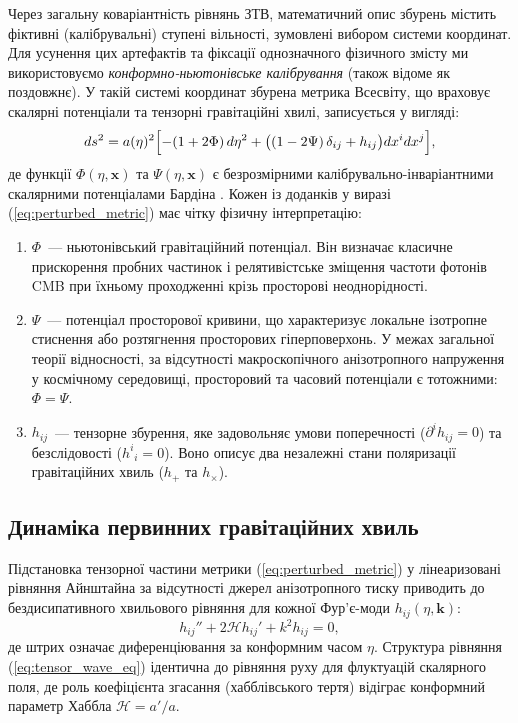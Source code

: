 \documentclass[12pt, a4paper]{article}
\begin{document}
Через загальну коваріантність рівнянь ЗТВ, математичний опис збурень містить фіктивні (калібрувальні) ступені вільності, зумовлені вибором системи координат. Для усунення цих артефактів та фіксації однозначного фізичного змісту ми використовуємо \emph{конформно-ньютонівське калібрування} (також відоме як поздовжнє). У такій системі координат збурена метрика Всесвіту, що враховує скалярні потенціали та тензорні гравітаційні хвилі, записується у вигляді:
\begin{equation}\label{eq:perturbed_metric}
  ds^2 = a(\eta)^2 \Bigl[ -(1 + 2\Phi)\,d\eta^2 + \bigl((1 - 2\Psi)\,\delta_{ij} + h_{ij}\bigr)dx^i dx^j \Bigr],
\end{equation}
де функції $\Phi(\eta, \mathbf{x})$ та $\Psi(\eta, \mathbf{x})$ є безрозмірними калібрувально-інваріантними скалярними потенціалами Бардіна \cite{bardeen_1980}. Кожен із доданків у виразі (\ref{eq:perturbed_metric}) має чітку фізичну інтерпретацію:
\begin{enumerate}
  \item $\Phi$~--- ньютонівський гравітаційний потенціал. Він визначає класичне прискорення пробних частинок і релятивістське зміщення частоти фотонів CMB при їхньому проходженні крізь просторові неоднорідності.
  \item $\Psi$~--- потенціал просторової кривини, що характеризує локальне ізотропне стиснення або розтягнення просторових гіперповерхонь. У межах загальної теорії відносності, за відсутності макроскопічного анізотропного напруження у космічному середовищі, просторовий та часовий потенціали є тотожними: $\Phi = \Psi$.
  \item $h_{ij}$~--- тензорне збурення, яке задовольняє умови поперечності ($\partial^i h_{ij} = 0$) та безслідовості ($h^i{}_i = 0$). Воно описує два незалежні стани поляризації гравітаційних хвиль ($h_+$ та $h_\times$).
\end{enumerate}

\subsection{Динаміка первинних гравітаційних хвиль}

Підстановка тензорної частини метрики (\ref{eq:perturbed_metric}) у лінеаризовані рівняння Айнштайна за відсутності джерел анізотропного тиску приводить до бездисипативного хвильового рівняння для кожної Фур'є-моди $h_{ij}(\eta, \mathbf{k})$:
\begin{equation}\label{eq:tensor_wave_eq}
  h_{ij}'' + 2\mathcal{H}h_{ij}' + k^2 h_{ij} = 0,
\end{equation}
де штрих означає диференціювання за конформним часом $\eta$. Структура рівняння (\ref{eq:tensor_wave_eq}) ідентична до рівняння руху для флуктуацій скалярного поля, де роль коефіцієнта згасання (хабблівського тертя) відіграє конформний параметр Хаббла $\mathcal{H} = a'/a$.
\end{document}
